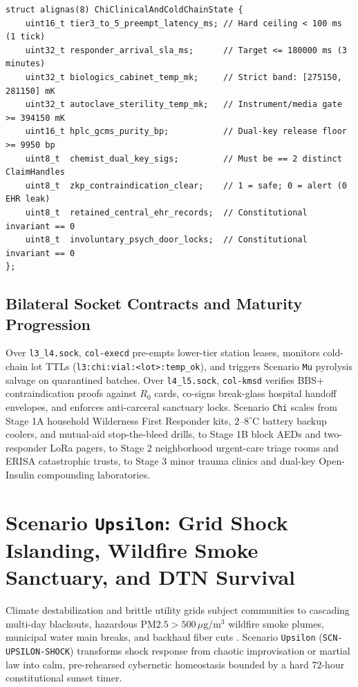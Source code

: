 \begin{lstlisting}[caption={Scenario \texttt{Chi} Trauma Preemption, Cold-Chain Biologics, and Dual-Key HPLC Structs},label={lst:chi-structs}]
struct alignas(8) ChiClinicalAndColdChainState {
    uint16_t tier3_to_5_preempt_latency_ms; // Hard ceiling < 100 ms (1 tick)
    uint32_t responder_arrival_sla_ms;      // Target <= 180000 ms (3 minutes)
    uint32_t biologics_cabinet_temp_mk;     // Strict band: [275150, 281150] mK
    uint32_t autoclave_sterility_temp_mk;   // Instrument/media gate >= 394150 mK
    uint16_t hplc_gcms_purity_bp;           // Dual-key release floor >= 9950 bp
    uint8_t  chemist_dual_key_sigs;         // Must be == 2 distinct ClaimHandles
    uint8_t  zkp_contraindication_clear;    // 1 = safe; 0 = alert (0 EHR leak)
    uint8_t  retained_central_ehr_records;  // Constitutional invariant == 0
    uint8_t  involuntary_psych_door_locks;  // Constitutional invariant == 0
};
\end{lstlisting}

\subsection{Bilateral Socket Contracts and Maturity Progression}

Over \texttt{l3\_l4.sock}, \texttt{col-execd} pre-empts lower-tier station leases, monitors cold-chain lot TTLs (\texttt{l3:chi:vial:<lot>:temp\_ok}),
and triggers Scenario \texttt{Mu} pyrolysis salvage on quarantined batches. Over \texttt{l4\_l5.sock}, \texttt{col-kmsd} verifies BBS+ contraindication
proofs against $R_0$ cards, co-signs break-glass hospital handoff envelopes, and enforces anti-carceral sanctuary locks. Scenario \texttt{Chi} scales
from Stage 1A household Wilderness First Responder kits, $2\text{--}8^\circ\mathrm{C}$ battery backup coolers, and mutual-aid stop-the-bleed drills, to
Stage 1B block AEDs and two-responder LoRa pagers, to Stage 2 neighborhood urgent-care triage rooms and ERISA catastrophic trusts, to Stage 3 minor
trauma clinics and dual-key Open-Insulin compounding laboratories.

\section{Scenario \texttt{Upsilon}: Grid Shock Islanding, Wildfire Smoke Sanctuary, and DTN Survival}
\label{sec:scn-upsilon}

Climate destabilization and brittle utility grids subject communities to cascading multi-day blackouts, hazardous
$\mathrm{PM2.5} > 500\,\mu\mathrm{g/m^3}$ wildfire smoke plumes, municipal water main breaks, and backhaul fiber cuts
\parencite{holling1973,rockstrom2009safe}. Scenario \texttt{Upsilon} (\texttt{SCN-UPSILON-SHOCK}) transforms shock response from chaotic improvisation
or martial law into calm, pre-rehearsed cybernetic homeostasis bounded by a hard $72\text{-hour}$ constitutional sunset timer.

